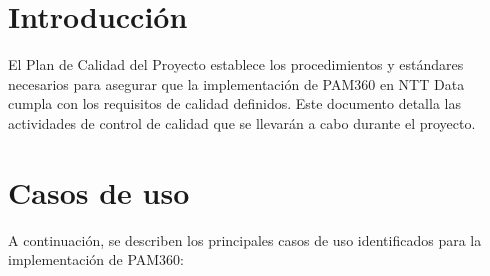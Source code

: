 
\section{Introducción}

El Plan de Calidad del Proyecto establece los procedimientos y estándares necesarios para asegurar que la implementación de PAM360 en NTT Data cumpla con los requisitos de calidad definidos. Este documento detalla las actividades de control de calidad que se llevarán a cabo durante el proyecto.

\section{Casos de uso}
A continuación, se describen los principales casos de uso identificados para la implementación de PAM360:

